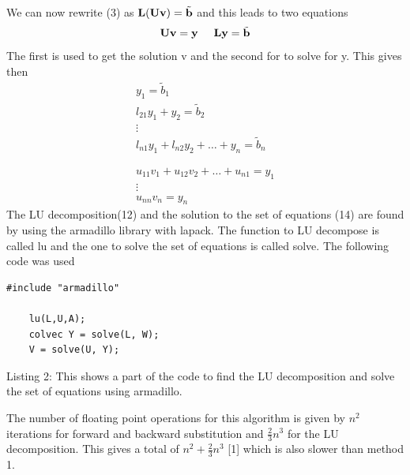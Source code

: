 \documentclass[11pt,a4wide]{article}
\begin{document}
We can now rewrite (3) as ${\bf L}({\bf U}{\bf v})= \tilde{{\bf b}}$ and this leads to two equations 
\begin{equation}
 {\bf U}{\bf v} ={\bf y} \hspace{0.5cm} {\bf L}{\bf y} =\tilde{{\bf b}}
\end{equation}
The first is used to get the solution v and the second for to solve for y. This gives then 
\begin{equation}
\begin{split}
 	y_1 = \tilde{b}_1 \\
 	l_{21}y_1 + y_2 = \tilde{b}_2\\
 	\vdots\\
 	l_{n1}y_1 + l_{n2}y_2 + \dots +y_n  =\tilde{b}_n \\
 	\\
 	\\
 	u_{11}v_1 +u_{12}v_2+\dots+u_{n1} =y_1\\
 	\vdots\\
	u_{nn}v_n = y_n  	
\end{split}
\end{equation}
The LU decomposition(12) and the solution to the set of equations (14) are found by using the armadillo library with lapack. 
The function to LU decompose is called lu and the one to solve the set of equations is called solve. The following code was used
\begin{lstlisting}[title={Project1}]
#include "armadillo"
  
    lu(L,U,A);
    colvec Y = solve(L, W);
    V = solve(U, Y);
\end{lstlisting}     
Listing 2: This shows a part of the code to find the LU decomposition and solve the set of equations using armadillo. 

The number of floating point operations for this algorithm is given by $n^2$ iterations for forward and backward substitution and
$\frac{2}{3}n^3$ for the LU decomposition. This gives a total of $n^2+\frac{2}{3}n^3$ [1] which is also slower than method 1. 
\end{document}
